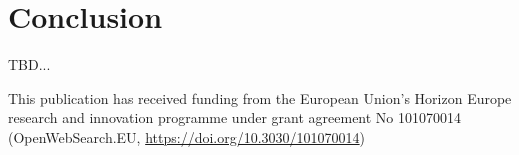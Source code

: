 \section{Conclusion}
\label{conclusion}

TBD...

\begin{acknowledgments}
  This publication has received funding from the European Union's Horizon Europe research and innovation programme under grant agreement No 101070014 (OpenWebSearch.EU, \url{https://doi.org/10.3030/101070014})
\end{acknowledgments}
